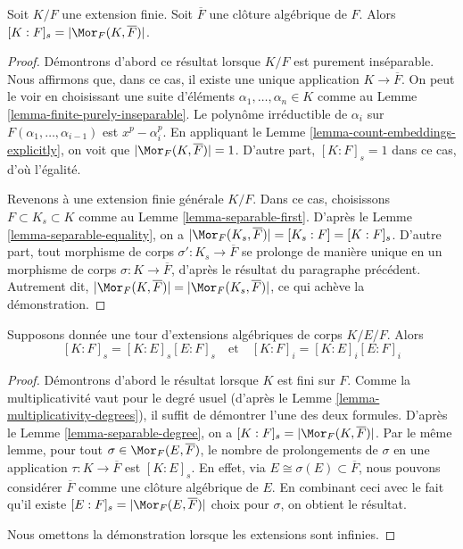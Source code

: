 \begin{lemma}
\label{lemma-separable-degree}
Soit $K/F$ une extension finie. Soit $\overline{F}$ une clôture algébrique
de $F$. Alors $[K : F]_s = |\Mor_F(K, \overline{F})|$.
\end{lemma}

\begin{proof}
Démontrons d'abord ce résultat lorsque $K/F$ est purement inséparable. Nous affirmons
que, dans ce cas, il existe une unique application $K \to \overline{F}$. On peut le
voir en choisissant une suite d'éléments $\alpha_1, \ldots, \alpha_n \in K$
comme au Lemme \ref{lemma-finite-purely-inseparable}. Le polynôme irréductible
de $\alpha_i$ sur $F(\alpha_1, \ldots, \alpha_{i - 1})$ est $x^p - \alpha_i^p$.
En appliquant le Lemme \ref{lemma-count-embeddings-explicitly}, on voit que
$|\Mor_F(K, \overline{F})| = 1$. D'autre part, $[K : F]_s = 1$
dans ce cas, d'où l'égalité.

\medskip\noindent
Revenons à une extension finie générale $K/F$. Dans ce cas,
choisissons $F \subset K_s \subset K$ comme au Lemme \ref{lemma-separable-first}.
D'après le Lemme \ref{lemma-separable-equality}, on a
$|\Mor_F(K_s, \overline{F})| = [K_s : F] = [K : F]_s$.
D'autre part, tout morphisme de corps $\sigma' : K_s \to \overline{F}$
se prolonge de manière unique en un morphisme de corps $\sigma : K \to \overline{F}$, d'après le
résultat du paragraphe précédent. Autrement dit,
$|\Mor_F(K, \overline{F})| = |\Mor_F(K_s, \overline{F})|$,
ce qui achève la démonstration.
\end{proof}

\begin{lemma}[Multiplicativité]
\label{lemma-multiplicativity-all-degrees}
Supposons donnée une tour d'extensions algébriques de corps $K/E/F$. Alors
$$
[K : F]_s = [K : E]_s [E : F]_s
\quad\text{et}\quad
[K : F]_i = [K : E]_i [E : F]_i
$$
\end{lemma}

\begin{proof}
Démontrons d'abord le résultat lorsque $K$ est fini sur $F$. Comme la
multiplicativité vaut pour le degré usuel (d'après le
Lemme \ref{lemma-multiplicativity-degrees}), il suffit de démontrer
l'une des deux formules. D'après le Lemme \ref{lemma-separable-degree}, on a
$[K : F]_s = |\Mor_F(K, \overline{F})|$. Par le même lemme,
pour tout $\sigma \in \Mor_F(E, \overline{F})$, le nombre de prolongements
de $\sigma$ en une application $\tau : K \to \overline{F}$ est $[K : E]_s$.
En effet, via $E \cong \sigma(E) \subset \overline{F}$, nous pouvons considérer
$\overline{F}$ comme une clôture algébrique de $E$. En combinant ceci avec le
fait qu'il existe $[E : F]_s = |\Mor_F(E, \overline{F})|$ choix
pour $\sigma$, on obtient le résultat.

\medskip\noindent
Nous omettons la démonstration lorsque les extensions sont infinies.
\end{proof}









